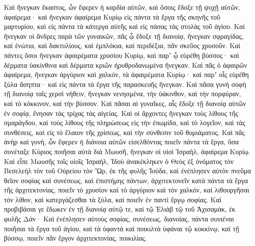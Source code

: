 {Καὶ ἤνεγκαν ἕκαστος, ὧν ἔφερεν ἡ καρδία αὐτῶν, καὶ ὅσοις ἔδοξε τῇ ψυχῇ αὐτῶν, ἀφαίρεμα· καὶ ἤνεγκαν ἀφαίρεμα Κυρίῳ εἰς πάντα τὰ ἔργα τῆς σκηνῆς τοῦ μαρτυρίου, καὶ εἰς πάντα τὰ κάτεργα αὐτῆς καὶ εἰς πάσας τὰς στολὰς τοῦ ἁγίου.
Καὶ ἤνεγκαν οἱ ἄνδρες παρὰ τῶν γυναικῶν, πᾶς ᾧ ἔδοξε τῇ διανοίᾳ, ἤνεγκαν σφραγίδας, καὶ ἐνώτια, καὶ δακτυλίους, καὶ ἐμπλόκια, καὶ περιδέξια, πᾶν σκεῦος χρυσοῦν.
Καὶ πάντες ὅσοι ἤνεγκαν ἀφαιρέματα χρυσίου Κυρίῳ, καὶ παρʼ ᾧ εὑρέθη βύσσος· καὶ δέρματα ὑακίνθινα καὶ δέρματα κριῶν ἠρυθροδανωμένα ἤνεγκαν.
Καὶ πᾶς ὁ ἀφαιρῶν ἀφαίρεμα, ἤνεγκαν ἀργύριον καὶ χαλκὸν, τὰ ἀφαιρέματα Κυρίῳ· καὶ παρʼ οἷς εὑρέθη ξύλα ἄσηπτα· καὶ εἰς πάντα τὰ ἔργα τῆς παρασκευῆς ἤνεγκαν.
Καὶ πᾶσα γυνὴ σοφὴ τῇ διανοίᾳ ταῖς χερσὶ νήθειν, ἤνεγκαν νενησμένα, τὴν ὑάκινθον, καὶ τὴν πορφύραν, καὶ τὸ κόκκινον, καὶ τὴν βύσσον.
Καὶ πᾶσαι αἱ γυναῖκες, αἷς ἔδοξε τῇ διανοίᾳ αὐτῶν ἐν σοφίᾳ, ἔνησαν τὰς τρίχας τὰς αἰγείας.
Καὶ οἱ ἄρχοντες ἤνεγκαν τοὺς λίθους τῆς σμαράγδου, καὶ τοὺς λίθους τῆς πληρώσεως εἰς τὴν ἐπωμίδα, καὶ τὸ λογεῖον,
καὶ τὰς συνθέσεις, καὶ εἰς τὸ ἔλαιον τῆς χρίσεως, καὶ τὴν σύνθεσιν τοῦ θυμιάματος.
Καὶ πᾶς ἀνὴρ καὶ γυνὴ, ὧν ἔφερεν ἡ διάνοια αὐτῶν εἰσελθόντας ποιεῖν πάντα τὰ ἔργα, ὅσα συνέταξε Κύριος ποιῆσαι αὐτὰ διὰ Μωυσῆ, ἤνεγκαν οἱ υἱοὶ Ἰσραὴλ, ἀφαίρεμα Κυρίῳ.
Καὶ εἶπε Μωυσῆς τοῖς υἱοῖς Ἰσραὴλ, Ἰδοὺ ἀνακέκληκεν ὁ Θεὸς ἐξ ὀνόματος τὸν Βεσελεὴλ τὸν τοῦ Οὐρείου τὸν Ὢρ, ἐκ τῆς φυλῆς Ἰούδα,
καὶ ἐνέπλησεν αὐτὸν πνεῦμα θεῖον σοφίας καὶ συνέσεως, καὶ ἐπιστήμης πάντων,
ἀρχιτεκτονεῖν κατὰ πάντα τὰ ἔργα τῆς ἀρχιτεκτονίας, ποιεῖν τὸ χρυσίον καὶ τὸ ἀργύριον καὶ τὸν χαλκόν,
καὶ λιθουργῆσαι τὸν λίθον, καὶ κατεργάζεσθαι τὰ ξύλα, καὶ ποιεῖν ἐν παντὶ ἔργῳ σοφίας.
Καὶ προβιβάσαι γε ἔδωκεν ἐν τῇ διανοίᾳ αὐτῷ τε, καὶ τῷ Ἐλιὰβ τῷ τοῦ Ἀχισαμὰκ, ἐκ φυλῆς Δάν·
Καὶ ἐνέπλησεν αὐτοὺς σοφίας, συνέσεως, διανοίας, πάντα συνιέναι ποιῆσαι τὰ ἔργα τοῦ ἁγίου, καὶ τὰ ὑφαντὰ καὶ ποικιλτὰ ὑφάναι τῷ κοκκίνῳ, καὶ τῇ βύσσῳ, ποιεῖν πᾶν ἔργον ἀρχιτεκτονίας, ποικιλίας.

}
